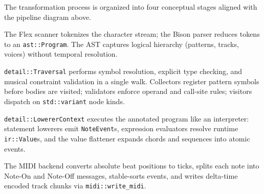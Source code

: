 The transformation process is organized into four conceptual stages aligned with the pipeline diagram above.

 The Flex scanner tokenizes the character stream; the Bison parser reduces tokens to an
\texttt{ast::Program}.
The AST captures logical hierarchy (patterns, tracks, voices) without temporal resolution.

 \texttt{detail::Traversal} performs symbol resolution,
explicit type checking, and musical constraint validation in a single walk.
Collectors register pattern symbols before bodies are visited; validators enforce operand and call-site rules; visitors
dispatch on \texttt{std::variant} node kinds.

 \texttt{detail::LowererContext} executes the annotated program like an
interpreter: statement lowerers emit \texttt{NoteEvent}s, expression evaluators resolve runtime \texttt{ir::Value}s, and
the value flattener expands chords and sequences into atomic events.

 The MIDI backend converts absolute beat positions to ticks, splits each note
into Note-On and Note-Off messages, stable-sorts events, and writes delta-time encoded track chunks via
\texttt{midi::write\_midi}.

